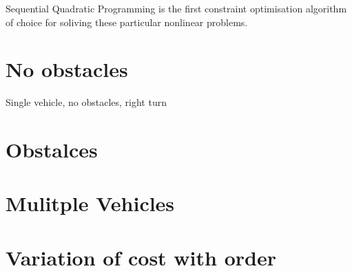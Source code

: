 \cleardoublepage
\label{chap:results}

\par Sequential Quadratic Programming is the first constraint optimisation algorithm of choice for soliving these particular nonlinear problems.

\section{No obstacles}

Single vehicle, no obstacles,  right turn


\section{Obstalces}


\section{Mulitple Vehicles}


\section{Variation of cost with order}



